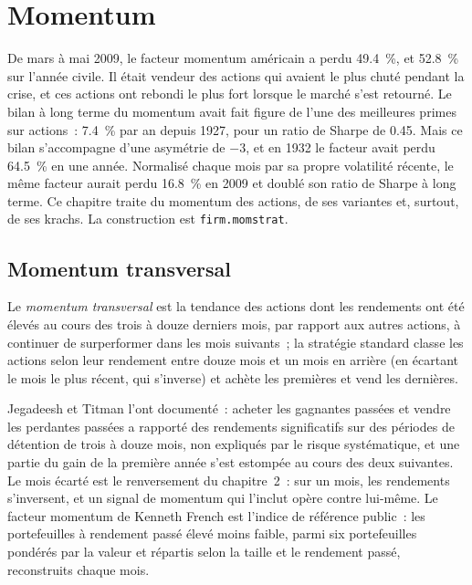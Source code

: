 \chapter{Momentum}\label{ch:s1:momentum}

De mars à mai 2009, le facteur momentum américain a perdu 49.4~\%, et 52.8~\% sur l'année civile. Il était vendeur des actions qui avaient le plus chuté pendant la crise, et
ces actions ont rebondi le plus fort lorsque le marché s'est retourné. Le bilan à long terme du momentum avait fait figure de l'une des meilleures primes sur actions~: 7.4~\% par an depuis
1927, pour un ratio de Sharpe de 0.45. Mais ce bilan s'accompagne d'une asymétrie de $-3$, et en 1932 le facteur avait perdu 64.5~\% en une année. Normalisé chaque mois par sa
propre volatilité récente, le même facteur aurait perdu 16.8~\% en 2009 et doublé son ratio de Sharpe à long terme. Ce chapitre traite du momentum des actions, de ses
variantes et, surtout, de ses krachs. La construction est \texttt{firm.momstrat}.

\section{Momentum transversal}

\begin{definition}\label{def:s1:momentum:cross}
Le \emph{momentum transversal} est la tendance des actions dont les rendements ont été élevés au cours des trois à douze derniers mois, par rapport
aux autres actions, à continuer de surperformer dans les mois suivants~; la stratégie standard classe les actions selon leur rendement entre douze mois et un mois en arrière (en écartant
le mois le plus récent, qui s'inverse) et achète les premières et vend les dernières.
\end{definition}

Jegadeesh et Titman l'ont documenté~: acheter les gagnantes passées et vendre les perdantes passées a rapporté des rendements significatifs sur des périodes de détention de trois à douze
mois, non expliqués par le risque systématique, et une partie du gain de la première année s'est estompée au cours des deux suivantes. Le mois écarté est le renversement du chapitre~2~: sur
un mois, les rendements s'inversent, et un signal de momentum qui l'inclut opère contre lui-même. Le facteur momentum de Kenneth French est l'indice de référence public~: les
portefeuilles à rendement passé élevé moins faible, parmi six portefeuilles pondérés par la valeur et répartis selon la taille et le rendement passé, reconstruits chaque mois.

